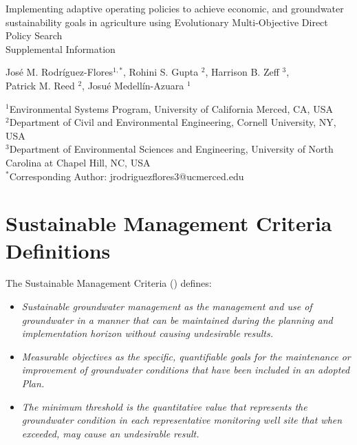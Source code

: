 \documentclass[11pt,a4paper]{article}
\date{}
\begin{document}
\begin{center}
\Large
Implementing adaptive operating policies to achieve economic, and groundwater sustainability goals in agriculture using Evolutionary Multi-Objective Direct Policy Search \\ 
\vspace{0.5cm}
Supplemental Information 
\end{center}

\begin{center}
José M. Rodríguez-Flores$^{1,*}$, Rohini S. Gupta $^2$, Harrison B. Zeff $^3$,\\ Patrick M. Reed $^2$, Josué Medellín-Azuara $^1$\\
\end{center}

\begin{center}
\small
$^1$Environmental Systems Program, University of California Merced, CA, USA\\
$^2$Department of Civil and Environmental Engineering, Cornell University, NY, USA\\
$^3$Department of Environmental Sciences and Engineering, University of North Carolina at Chapel Hill, NC, USA\\
$^*$Corresponding Author: jrodriguezflores3@ucmerced.edu
\end{center}

\vspace{0.2cm}

\section{Sustainable Management Criteria Definitions}

The Sustainable Management Criteria (\cite{dwr_sustainable_2017}) defines:

\begin{itemize}
    \item \textit{Sustainable groundwater management as the management and use of groundwater in a manner that can be maintained during the planning and
    implementation horizon without causing undesirable results.}
    \item \textit{Measurable objectives as the specific, quantifiable goals for the maintenance or improvement of groundwater conditions that have been included in an adopted Plan.}
    \item \textit{The minimum threshold is the quantitative value that represents the groundwater condition in each representative monitoring well site that when exceeded, may cause an undesirable result.}
\end{itemize}
\end{document}
